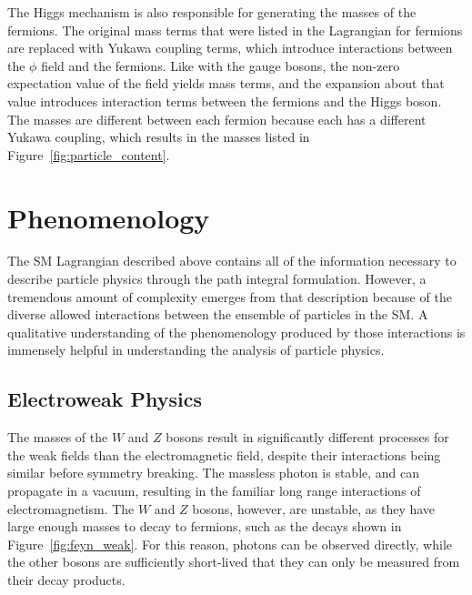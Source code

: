 The Higgs mechanism is also responsible for generating the masses of the fermions.
The original mass terms that were listed in the Lagrangian for fermions are replaced with Yukawa coupling terms, which introduce interactions between the $\phi$ field and the fermions.
Like with the gauge bosons, the non-zero expectation value of the field yields mass terms, and the expansion about that value introduces interaction terms between the fermions and the Higgs boson.
The masses are different between each fermion because each has a different Yukawa coupling, which results in the masses listed in Figure~\ref{fig:particle_content}.

\section{Phenomenology}

The \ac{SM} Lagrangian described above contains all of the information necessary to describe particle physics through the path integral formulation. 
However, a tremendous amount of complexity emerges from that description because of the diverse allowed interactions between the ensemble of particles in the \ac{SM}.
A qualitative understanding of the phenomenology produced by those interactions is immensely helpful in understanding the analysis of particle physics.

\subsection{Electroweak Physics}

The masses of the $W$ and $Z$ bosons result in significantly different processes for the weak fields than the electromagnetic field, despite their interactions being similar before symmetry breaking.
The massless photon is stable, and can propagate in a vacuum, resulting in the familiar long range interactions of electromagnetism.
The $W$ and $Z$ bosons, however, are unstable, as they have large enough masses to decay to fermions, such as the decays shown in Figure~\ref{fig:feyn_weak}.
For this reason, photons can be observed directly, while the other bosons are sufficiently short-lived that they can only be measured from their decay products.

